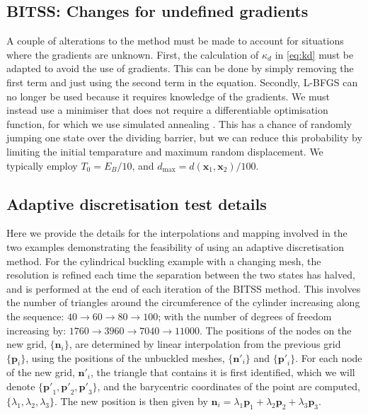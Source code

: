 \documentclass[twocolumn,10pt]{revtex4}
\begin{document}
\subsection{BITSS: Changes for undefined gradients}
A couple of alterations to the method must be made to account for situations where the gradients are unknown.
First, the calculation of $\kappa_d$ in \cref{eq:kd} must be adapted to avoid the use of gradients.
This can be done by simply removing the first term and just using the second term in the equation.
Secondly, L-BFGS can no longer be used because it requires knowledge of the gradients.
We must instead use a minimiser that does not require a differentiable optimisation function, for which we use simulated annealing \cite{Kirkpatrick1983}.
This has a chance of randomly jumping one state over the dividing barrier, but we can reduce this probability by limiting the initial temparature and maximum random displacement.
We typically employ $T_0 = E_B / 10$, and $d_\text{max} = d(\bm{x}_1, \bm{x}_2) / 100$.

\subsection{Adaptive discretisation test details}
Here we provide the details for the interpolations and mapping involved in the two examples demonstrating the feasibility of using an adaptive discretisation method.
For the cylindrical buckling example with a changing mesh, the resolution is refined each time the separation between the two states has halved, and is performed at the end of each iteration of the BITSS method.
This involves the number of triangles around the circumference of the cylinder increasing along the sequence: $40 \rightarrow 60 \rightarrow 80 \rightarrow 100$; with the number of degrees of freedom increasing by: $1760 \rightarrow 3960 \rightarrow 7040 \rightarrow 11000$.
The positions of the nodes on the new grid, $\{\bm{n}_i\}$, are determined by linear interpolation from the previous grid $\{\bm{p}_i\}$, using the positions of the unbuckled meshes, $\{\bm{n'}_i\}$ and $\{\bm{p'}_i\}$.
For each node of the new grid, $\bm{n'}_i$, the triangle that contains it is first identified, which we will denote $\{\bm{p'}_1,\bm{p'}_2,\bm{p'}_3\}$, and the barycentric coordinates of the point are computed, $\{\lambda_1,\lambda_2,\lambda_3\}$.
The new position is then given by $\bm{n}_i = \lambda_1 \bm{p}_1 + \lambda_2 \bm{p}_2 + \lambda_3 \bm{p}_3$.
\end{document}
